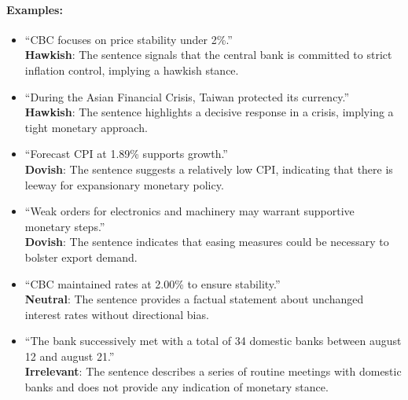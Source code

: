 \paragraph{Examples: }
\begin{itemize}
    \item ``CBC focuses on price stability under 2\%.''\\
    \textbf{Hawkish}: The sentence signals that the central bank is committed to strict inflation control, implying a hawkish stance.
    
    \item ``During the Asian Financial Crisis, Taiwan protected its currency.''\\
    \textbf{Hawkish}: The sentence highlights a decisive response in a crisis, implying a tight monetary approach.
    
    \item ``Forecast CPI at 1.89\% supports growth.''\\
    \textbf{Dovish}: The sentence suggests a relatively low CPI, indicating that there is leeway for expansionary monetary policy.
    
    \item ``Weak orders for electronics and machinery may warrant supportive monetary steps.''\\
    \textbf{Dovish}: The sentence indicates that easing measures could be necessary to bolster export demand.
    
    \item ``CBC maintained rates at 2.00\% to ensure stability.''\\
    \textbf{Neutral}: The sentence provides a factual statement about unchanged interest rates without directional bias.

    \item ``The bank successively met with a total of 34 domestic banks between august 12 and august 21.''\\
    \textbf{Irrelevant}: The sentence describes a series of routine meetings with domestic banks and does not provide any indication of monetary stance.
\end{itemize}

\newpage

